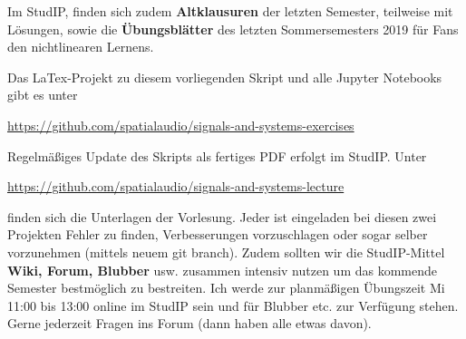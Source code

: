 \documentclass[11pt,a4paper,DIV=12]{scrartcl}
\numberwithin{equation}{section}
\numberwithin{figure}{section}
\begin{document}
Im StudIP, finden sich zudem \textbf{Altklausuren} der letzten Semester,
teilweise mit Lösungen, sowie die \textbf{Übungsblätter} des letzten
Sommersemesters 2019 für Fans den nichtlinearen Lernens.

Das LaTex-Projekt zu diesem vorliegenden Skript und alle Jupyter Notebooks
gibt es unter
\begin{mdframed}[backgroundcolor=C2!10]
\url{https://github.com/spatialaudio/signals-and-systems-exercises}
\end{mdframed}
%
Regelmäßiges Update des Skripts als fertiges PDF erfolgt im StudIP.
%
Unter
\begin{mdframed}[backgroundcolor=C2!10]
\url{https://github.com/spatialaudio/signals-and-systems-lecture}
\end{mdframed}
finden sich die Unterlagen der Vorlesung.
%
Jeder ist eingeladen bei diesen zwei Projekten Fehler zu finden, Verbesserungen
vorzuschlagen oder sogar selber vorzunehmen (mittels neuem git branch).
%
Zudem sollten wir die StudIP-Mittel \textbf{Wiki, Forum, Blubber} usw. zusammen
intensiv nutzen um das kommende Semester bestmöglich zu bestreiten.
%
Ich werde zur planmäßigen Übungszeit Mi 11:00 bis 13:00 online im StudIP sein
und für Blubber etc. zur Verfügung stehen.
%
Gerne jederzeit Fragen ins Forum (dann haben alle etwas davon).

\newpage
\end{document}
